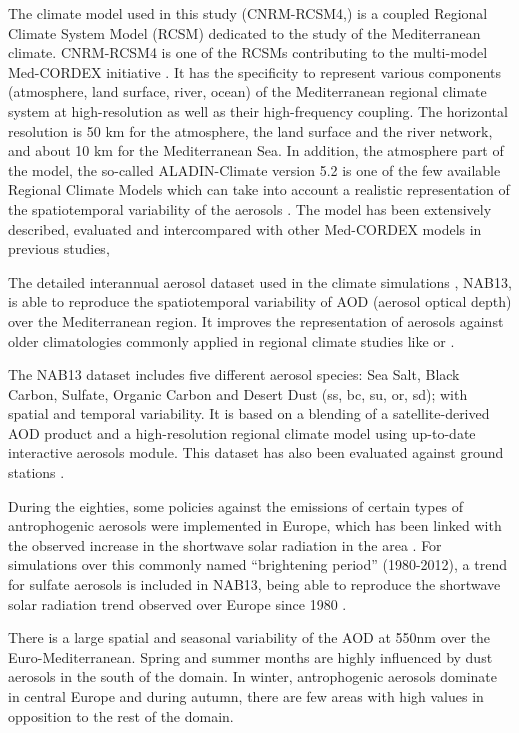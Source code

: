 The climate model used in this study (CNRM-RCSM4,\citep{Sevault2014}) is a coupled Regional Climate System Model (RCSM) dedicated to the study of the Mediterranean climate. CNRM-RCSM4 is one of the RCSMs contributing to the multi-model Med-CORDEX initiative \citep{Ruti2016}. It has the specificity to represent various components (atmosphere, land surface, river, ocean) of the Mediterranean regional climate system at high-resolution as well as their high-frequency coupling. The horizontal resolution is 50 km for the atmosphere, the land surface and the river network, and about 10 km for the Mediterranean Sea. In addition, the atmosphere part of the model, the so-called ALADIN-Climate version 5.2 \citep{Colin2010} is one of the few available Regional Climate Models which can take into account a realistic representation of the spatiotemporal variability of the aerosols \citep{Nabat2014}. The model has been extensively described, evaluated and intercompared with other Med-CORDEX models in previous studies, \cite{Sevault2014, Nabat2014, Nabat2014a,Flaounas2016, Gaertner2016, DellAquila2016, Harzallah2016, Cavicchia2016}

The detailed interannual aerosol dataset used in the climate simulations \citep{Nabat2013}, NAB13, is able to reproduce the spatiotemporal variability of AOD (aerosol optical depth) over the Mediterranean region. It improves the representation of aerosols against older climatologies commonly applied in regional climate studies like \cite{Tegen1997} or \cite{tanre1984first}.

The NAB13 dataset includes five different aerosol species: Sea Salt, Black Carbon, Sulfate, Organic Carbon and Desert Dust (ss, bc, su, or, sd); with spatial and temporal variability. It is based on a blending of a satellite-derived AOD product and a high-resolution regional climate model using up-to-date interactive aerosols module. This dataset has also been evaluated against ground stations \citep{Nabat2013}.

During the eighties, some policies against the emissions of certain types of antrophogenic aerosols were implemented in Europe, which has been linked with the observed increase in the shortwave solar radiation in the area \citep{Wild2005}. For simulations over this commonly named ``brightening period'' (1980-2012), a trend for sulfate aerosols is included in NAB13, being able to reproduce the shortwave solar radiation trend observed over Europe since 1980 \citep{Nabat2014a}.

There is a large spatial and seasonal variability of the AOD at 550nm over the Euro-Mediterranean. Spring and summer months are highly influenced by dust aerosols in the south of the domain. In winter, antrophogenic aerosols dominate in central Europe and during autumn, there are few areas with high values in opposition to the rest of the domain.

